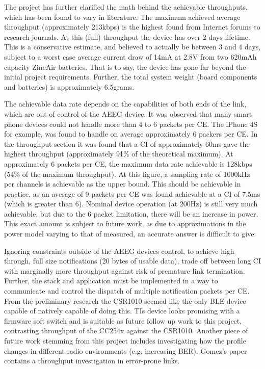 \documentclass[]{article}
\begin{document}
The project has further clarified the math behind the achievable throughputs, which has been found to vary in literature. The maximum achieved average throughput (approximately 213kbps) is the highest found from Internet forums to research journals. At this (full) throughput the device has over 2 days lifetime. This is a conservative estimate, and believed to actually be between 3 and 4 days, subject to a worst case average current draw of 14mA at 2.8V from two 620mAh capacity ZincAir batteries. That is to say, the device has gone far beyond the initial project requirements. Further, the total system weight (board components and batteries) is approximately 6.5grams.

The achievable data rate depends on the capabilities of both ends of the link, which are out of control of the \ac{AEEG} device. It was observed that many smart phone devices could not handle more than 4 to 6 packets per \ac{CE}. The iPhone 4S for example, was found to handle on average approximately 6 packers per \ac{CE}. In the throughput section it was found that a \ac{CI} of approximately 60ms gave the highest throughput (approximately 91\% of the theoretical maximum). At approximately 6 packets per \ac{CE}, the maximum data rate achievable is 128kbps (54\% of the maximum throughput). At this figure, a sampling rate of 1000kHz per channels is achievable as the upper bound. This should be achievable in practice, as an average of 9 packets per \ac{CE} was found achievable at a \ac{CI} of 7.5ms (which is greater than 6). Nominal device operation (at 200Hz) is still very much achievable, but due to the 6 packet limitation, there will be an increase in power. This exact amount is subject to future work, as due to approximations in the power model varying to that of measured, an accurate answer is difficult to give.

Ignoring constraints outside of the \ac{AEEG} devices control, to achieve high through, full size notifications (20 bytes of usable data), trade off between long \ac{CI} with marginally more throughput against risk of premature link termination. Further, the stack and application must be implemented in a way to communicate and control the dispatch of multiple notification packets per \ac{CE}. From the preliminary research the CSR1010 seemed like the only \ac{BLE} device capable of natively capable of doing this. \ac{TI}s device looks promising with a firmware soft switch and is suitable as future follow up work to this project, contrasting throughput of the CC254x against the CSR1010. Another piece of future work stemming from this project includes investigating how the profile changes in different radio environments (e.g. increasing \ac{BER}). Gomez's\cite{Gomez2011} paper contains a throughput investigation in error-prone links. 
\end{document}

